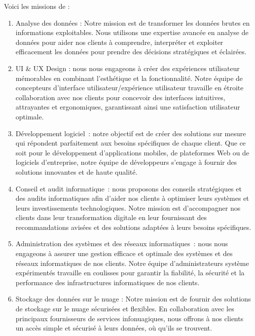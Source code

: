 Voici les missions de \firm :
\begin{enumerate}
  \item Analyse des données : Notre mission est de transformer les données brutes
    en informations exploitables. Nous utilisons une expertise avancée en analyse
    de données pour aider nos clients à comprendre, interpréter et exploiter efficacement
    les données pour prendre des décisions stratégiques et éclairées.
  \item UI \& UX Design : nous nous engageons à créer des expériences utilisateur mémorables
    en combinant l’esthétique et la fonctionnalité. Notre équipe de concepteurs
    d’interface utilisateur/expérience utilisateur travaille en étroite collaboration
    avec nos clients pour concevoir des interfaces intuitives, attrayantes et ergonomiques,
    garantissant ainsi une satisfaction utilisateur optimale.
  \item Développement logiciel : notre objectif est de créer des solutions sur
    mesure qui répondent parfaitement aux besoins spécifiques de chaque client.
    Que ce soit pour le développement d’applications mobiles, de plateformes Web
    ou de logiciels d’entreprise, notre équipe de développeurs s’engage à fournir
    des solutions innovantes et de haute qualité.
  \item Conseil et audit informatique : nous proposons des conseils stratégiques
    et des audits informatiques afin d’aider nos clients à optimiser leurs systèmes
    et leurs investissements technologiques. Notre mission est d’accompagner nos
    clients dans leur transformation digitale en leur fournissant des recommandations
    avisées et des solutions adaptées à leurs besoins spécifiques.
  \item Administration des systèmes et des réseaux informatiques : nous nous
    engageons à assurer une gestion efficace et optimale des systèmes et des
    réseaux informatiques de nos clients. Notre équipe d’administrateurs système
    expérimentés travaille en coulisses pour garantir la fiabilité, la sécurité et
    la performance des infrastructures informatiques de nos clients.
  \item Stockage des données sur le nuage : Notre mission est de fournir des solutions
    de stockage sur le nuage sécurisées et flexibles. En collaboration avec les
    principaux fournisseurs de services infonuagiques, nous offrons à nos clients
    un accès simple et sécurisé à leurs données, où qu’ils se trouvent.
\end{enumerate}

